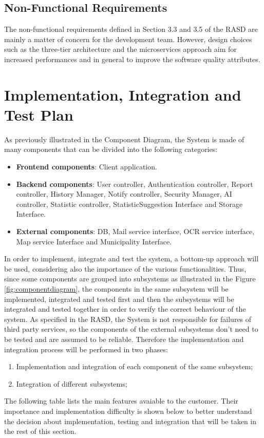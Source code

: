 \documentclass{report}
\begin{document}
\section{Non-Functional Requirements}
The non-functional requirements defined in Section 3.3 and 3.5 of the RASD are mainly a matter of concern for the development team. However, design choices such as the three-tier architecture and the microservices approach aim for increased performances and in general to improve the software quality attributes.

\chapter{Implementation, Integration and Test Plan}
As previously illustrated in the Component Diagram, the System is made of many components that can be divided into the following categories:
\begin{itemize}
\item \textbf{Frontend components}: Client application.
\item \textbf{Backend components}: User controller, Authentication controller, Report controller, History Manager, Notify controller, Security Manager, AI controller, Statistic controller, StatisticSuggestion Interface and Storage Interface.
\item \textbf{External components}: DB, Mail service interface, OCR service interface, Map service Interface and Municipality Interface.
\end{itemize}
In order to implement, integrate and test the system, a bottom-up approach will be used, considering also the importance of the various functionalities. Thus, since some components are grouped into subsystems as illustrated in the Figure \ref{fig:componentdiagram}, the components in the same subsystem will be implemented, integrated and tested first and then the subsystems will be integrated and tested together in order to verify the correct behaviour of the system. As specified in the RASD, the System is not responsible for failures of third party services, so the components of the external subsystems don't need to be tested and are assumed to be reliable. Therefore the implementation and integration process will be performed in two phases:
\begin{enumerate}
\item Implementation and integration of each component of the same subsystem;
\item Integration of different subsystems;
\end{enumerate}
The following table lists the main features avaiable to the customer. Their importance and implementation difficulty is shown below to better understand the decision about implementation, testing and integration that will be taken in the rest of this section.
\clearpage
\end{document}
